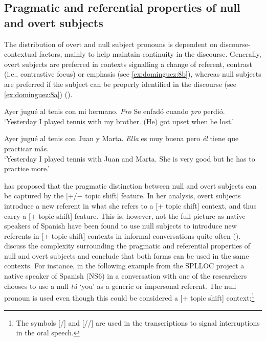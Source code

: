 \documentclass[output=paper]{langscibook}
\begin{document}
\subsection{Pragmatic and referential properties of null and overt subjects}

The distribution of overt and null subject pronouns is dependent on discourse-contextual factors, mainly to help maintain continuity in the discourse. Generally, overt subjects are preferred in contexts signalling a change of referent, contrast (i.e., contrastive focus) or emphasis (see \ref{ex:dominguez:8b}), whereas null subjects are preferred if the subject can be properly identified in the discourse (see \ref{ex:dominguez:8a}) (\citealt{Lujan1985,Lujan1986,Fernandez1989,Alonso-ovalleDIntrono2001}).

\ea
\label{ex:dominguez:8}
\ea\label{ex:dominguez:8a}
 Ayer jugué al tenis con mi hermano. \textit{Pro} Se enfadó cuando \textit{pro} perdió. \\
\glt ‘Yesterday I played tennis with my brother. (He) got upset when he lost.’

\ex\label{ex:dominguez:8b}
Ayer jugué al tenis con Juan y Marta. \textit{Ella} es muy buena pero \textit{él} tiene que practicar más.\\
\glt ‘Yesterday I played tennis with Juan and Marta. She is very good but he has to practice more.’
\z
\z

\citet{Sorace2000} has proposed that the pragmatic distinction between null and overt subjects can be captured by the [+/$-$ topic shift] feature. In her analysis, overt subjects introduce a new referent in what she refers to a [+ topic shift] context, and thus carry a [+ topic shift] feature. This is, however, not the full picture as native speakers of Spanish have been found to use null subjects to introduce new referents in [+ topic shift] contexts in informal conversations quite often (\citealt{Silva-Corvalan2001,Blackwell2003, LubbersBlackwell2009, LicerasEtAl2010,Dominguez2013,ClementsDomínguez2017}). \citet{LubbersBlackwell2009} discuss the complexity surrounding the pragmatic and referential properties of null and overt subjects and conclude that both forms can be used in the same contexts. For instance, in the following example from the SPLLOC project a native speaker of Spanish (NS6) in a conversation with one of the researchers chooses to use a null \textit{tú} ‘you’ as a generic or impersonal referent. The null pronoun is used even though this could be considered a [+ topic shift] context:\footnote{The symbols [/] and [//] are used in the transcriptions to signal interruptions in the oral speech.}
\end{document}
